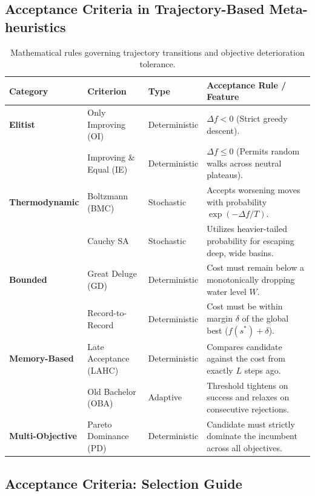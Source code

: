\documentclass{article}
\begin{document}

\subsection*{Acceptance Criteria in Trajectory-Based Meta-heuristics}

\begin{table}[H]
    \centering
    \caption{Mathematical rules governing trajectory transitions and objective deterioration tolerance.}
    \begin{tabularx}{\textwidth}{@{} l l l X @{}}
        \toprule
        \textbf{Category} & \textbf{Criterion} & \textbf{Type} & \textbf{Acceptance Rule / Feature} \\
        \midrule
        \textbf{Elitist} & Only Improving (OI) & Deterministic & $\Delta f < 0$ (Strict greedy descent). \\
        & Improving \& Equal (IE) & Deterministic & $\Delta f \le 0$ (Permits random walks across neutral plateaus). \\
        \textbf{Thermodynamic} & Boltzmann (BMC) & Stochastic & Accepts worsening moves with probability $\exp(-\Delta f / T)$. \\
        & Cauchy SA & Stochastic & Utilizes heavier-tailed probability for escaping deep, wide basins. \\
        \textbf{Bounded} & Great Deluge (GD) & Deterministic & Cost must remain below a monotonically dropping water level $W$. \\
        & Record-to-Record & Deterministic & Cost must be within margin $\delta$ of the global best ($f(s^*) + \delta$). \\
        \textbf{Memory-Based} & Late Acceptance (LAHC) & Deterministic & Compares candidate against the cost from exactly $L$ steps ago. \\
        & Old Bachelor (OBA) & Adaptive & Threshold tightens on success and relaxes on consecutive rejections. \\
        \textbf{Multi-Objective} & Pareto Dominance (PD) & Deterministic & Candidate must strictly dominate the incumbent across all objectives. \\
        \bottomrule
    \end{tabularx}
\end{table}

\subsection*{Acceptance Criteria: Selection Guide}
\end{document}
